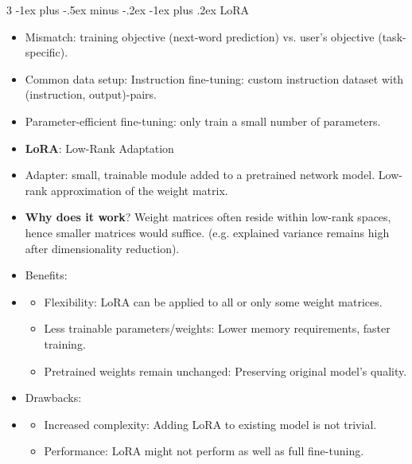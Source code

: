 \documentclass[10pt, landscape]{article}
\makeatletter
\renewcommand{\subsubsection}{\@startsection{subsubsection}{3}{0mm}%
  {-1ex plus -.5ex minus -.2ex}%
  {-1ex plus .2ex}%
{\normalfont\small\bfseries\itshape}}%
\makeatother
\begin{document}
\begin{multicols*}{3}
  \subsubsection{LoRA}
  \begin{itemize}
    \item Mismatch: training objective (next-word prediction) vs. user's objective (task-specific).
    \item Common data setup: Instruction fine-tuning: custom instruction dataset with (instruction, output)-pairs.
    \item Parameter-efficient fine-tuning: only train a small number of parameters.
    \item \textbf{LoRA}: Low-Rank Adaptation
    \item Adapter: small, trainable module added to a pretrained network model. Low-rank approximation of the weight matrix.
    \item \textbf{Why does it work}? Weight matrices often reside within low-rank spaces, hence smaller matrices would suffice. (e.g. explained variance remains high after dimensionality reduction).
    \item Benefits: 
    \item \begin{itemize}
      \item Flexibility: LoRA can be applied to all or only some weight matrices.
      \item Less trainable parameters/weights: Lower memory requirements, faster training.
      \item Pretrained weights remain unchanged: Preserving original model's quality.
    \end{itemize}
    \item Drawbacks:
    \item \begin{itemize}
      \item Increased complexity: Adding LoRA to existing model is not trivial.
      \item Performance: LoRA might not perform as well as full fine-tuning.
    \end{itemize}
  \end{itemize}

\end{multicols*}
\end{document}
